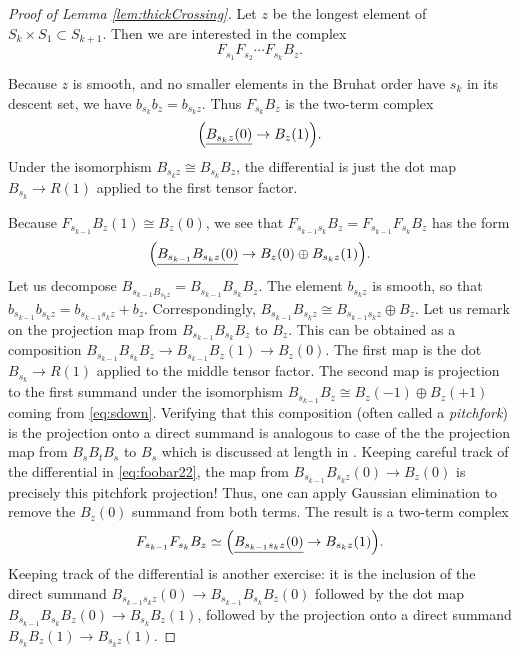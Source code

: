 \begin{proof}[Proof of Lemma \ref{lem:thickCrossing}]
Let $z$ be the longest element of $S_k\times S_1\subset S_{k+1}$. Then we are interested in the complex
\begin{equation} F_{s_1} F_{s_2} \cdots F_{s_k} B_z.\end{equation}

Because $z$ is smooth, and no smaller elements in the Bruhat order have $s_k$ in its descent set, we have $b_{s_k} b_z = b_{s_k z}$. Thus $F_{s_k} B_z$ is the two-term
complex \[\Big( \underline{B_{s_k z}(0)} \rightarrow B_z(1) \Big). \] Under the isomorphism $B_{s_k z} \cong B_{s_k} B_z$, the differential is just the dot map $B_{s_k} \to R(1)$ applied to the first tensor factor.

Because $F_{s_{k-1}} B_z(1) \cong B_z(0)$, we see that $F_{s_{k-1}s_k} B_z = F_{s_{k-1}} F_{s_k} B_z$ has the form
\begin{equation} \label{eq:foobar22}
\Big( \underline{B_{s_{k-1}} B_{s_k z} (0)} \rightarrow B_z(0) \oplus B_{s_k z}(1) \Big).
\end{equation}
Let us decompose $B_{s_{k-1} B_{s_k z}} = B_{s_{k-1}} B_{s_k} B_z$. The element $b_{s_k z}$ is smooth, so that $b_{s_{k-1}} b_{s_k z} = b_{s_{k-1}s_k z} + b_z$. Correspondingly, $B_{s_{k-1}} B_{s_k z} \cong B_{s_{k-1}s_k z} \oplus B_z$. Let us remark on the
projection map from $B_{s_{k-1}} B_{s_k} B_z$ to $B_z$. This can be obtained as a composition $B_{s_{k-1}} B_{s_k} B_z \to B_{s_{k-1}} B_z(1) \to B_z(0)$. The first
map is the dot $B_{s_k} \to R(1)$ applied to the middle tensor factor. The second map is projection to the first summand under the isomorphism $B_{s_{k-1}} B_z \cong B_z(-1) \oplus
B_z(+1)$ coming from \eqref{eq:sdown}. Verifying that this composition (often called a \emph{pitchfork}) is the projection onto a direct summand is analogous to case of the the
projection map from $B_s B_t B_s$ to $B_s$ which is discussed at length in \cite{EKho}. Keeping careful track of the differential in \eqref{eq:foobar22}, the map from $B_{s_{k-1}} B_{s_k z}(0) \to B_z(0)$ is precisely this pitchfork projection! Thus, one can apply Gaussian elimination to remove the $B_z(0)$ summand from both terms. The result is a two-term complex
\begin{equation}
F_{s_{k-1}} F_{s_k} B_z \simeq \Big( \underline{B_{s_{k-1}s_k z}(0)} \rightarrow B_{s_k z}(1) \Big).
\end{equation}
Keeping track of the differential is another exercise: it is the inclusion of the direct summand $B_{s_{k-1}s_k z}(0)\rightarrow B_{s_{k-1}}B_{s_k}B_z(0)$ followed by the dot map $B_{s_{k-1}}B_{s_k}B_z(0)\rightarrow B_{s_k}B_z(1)$, followed by the projection onto a direct summand $B_{s_k}B_z(1)\rightarrow B_{s_k z}(1)$.


\end{proof}
